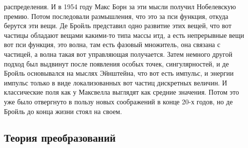 \documentclass[a4paper, 12pt]{article}
\begin{document}
распределения. И в 1954 году Макс Борн за эти мысли получил Нобелевскую 
премию. Потом последовали размышления, что это за пси функция, откуда 
берутся эти вещи. Де Бройль представил одно развитие этих вещей, что вот 
частицы обладают вещами какими-то типа массы итд, а есть непрерывные 
вещи вот пси функция, это волна, там есть фазовый множитель, она связана 
с частицей, а волна такая вот управляющая получается. Затем немного 
другой подход был выдвинут после появления особых точек, сингулярностей, 
и де Бройль основывался на мыслях Эйнштейна, что вот есть импульс, 
и энергии импульс только в виде локализованных вот частиц дискретных 
величин. И классические поля как у Максвелла выглядят как средние 
значения. Потом это уже было отвергнуто в пользу новых соображений 
в конце 20-х годов, но де Бройль до конца жизни стоял на своем.

\subsection{Теория преобразований}
\end{document}
